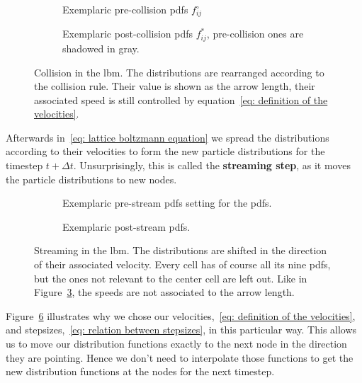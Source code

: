 \begin{figure}
\centering
\begin{subfigure}{.5\textwidth}
  \centering
  
\caption{Exemplaric pre-collision \glspl{pdf} $f_{ij}^\circ$\linebreak}
\label{fig: pre-collision example}
\end{subfigure}%
\begin{subfigure}{.5\textwidth}
  \centering
  
\caption{Exemplaric post-collision \glspl{pdf} $f_{ij}^*$, \newline pre-collision ones are shadowed in gray.}
\label{fig: post-collision example}
\end{subfigure}
\caption{Collision in the \gls{lbm}.
The distributions are rearranged according to the collision rule.
Their value is shown as the arrow length, their associated speed is still controlled by equation~\eqref{eq: definition of the velocities}.}
\label{fig: examplary collision}
\end{figure}

Afterwards in~\eqref{eq: lattice boltzmann equation} we spread the distributions according to their velocities to form the new particle distributions for the timestep $t+\Delta t$.
Unsurprisingly, this is called the \textbf{streaming step}, as it moves the particle distributions to new nodes.

\begin{figure}
\centering
\begin{subfigure}{.5\textwidth}
  \centering
  
\caption{Exemplaric pre-stream \glspl{pdf} setting for the \glspl{pdf}.}
\label{fig: pre-stream example}
\end{subfigure}%
\begin{subfigure}{.5\textwidth}
  \centering
  
  \caption{Exemplaric post-stream \glspl{pdf}.\linebreak}
\label{fig: post-stream example}
\end{subfigure}
\caption{Streaming in the \gls{lbm}.
The distributions are shifted in the direction of their associated velocity.
Every cell has of course all its nine \glspl{pdf}, but the ones not relevant to the center cell are left out.
Like in Figure~\ref{fig: examplary collision}, the speeds are not associated to the arrow length.}
\label{fig: examplary stream}
\end{figure}

Figure~\ref{fig: examplary stream} illustrates why we chose our velocities,~\eqref{eq: definition of the velocities}, and stepsizes,~\eqref{eq: relation between stepsizes}, in this particular way.
This allows us to move our distribution functions exactly to the next node in the direction they are pointing.
Hence we don't need to interpolate those functions to get the new distribution functions at the nodes for the next timestep.

